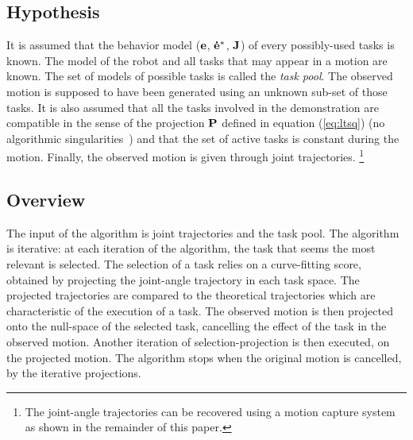 \documentclass[letterpaper, 10pt, conference]{ieeeconf}      %
\begin{document}
\subsection{Hypothesis}
It is assumed that the behavior model (${\mathbf{e}}$, ${\mathbf{\dot{e}^*}}$, ${\mathbf{J}}$) of every
possibly-used tasks is known. The model of the robot and all tasks that may appear in a 
motion are known. The set of models of possible tasks is called the \emph{task pool}.
The observed motion is supposed to have been generated using an unknown sub-set of those tasks.  
It is also assumed that all the tasks involved in the demonstration are compatible
in the sense of the projection ${\mathbf{P}}$ defined in equation (\ref{eq:ltsq})
(no algorithmic singularities~\cite{chiaverini97}) and that the set
of active tasks is constant during the motion.
Finally, the observed motion is given through
joint trajectories. \footnote{The joint-angle trajectories can be recovered using a motion
capture system as shown in the remainder of this paper.}

\subsection{Overview}
\label{sec:alg1:selec}
The input of the algorithm is joint trajectories and
the task pool. The algorithm is iterative: at each iteration of the algorithm, the task that seems the
most relevant is selected. The selection of a task relies
on a curve-fitting score, obtained by projecting the joint-angle trajectory in each task space.
The projected trajectories are
compared to the theoretical trajectories which are characteristic
of the execution of a task.
The observed motion is then projected
onto the null-space of the selected task, cancelling the effect of the task in the observed motion.
Another iteration of selection-projection is then executed, on the projected motion.
The algorithm stops when the original motion is cancelled, by the iterative projections.
\newcommand{\shOUTPUT}{\textbf{Output: }}
\newcommand{\shINPUT}{\textbf{Input: }}
\end{document}
